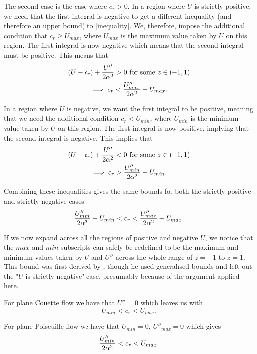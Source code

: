 The second case is the case where $ c_r > 0 $. In a region where $ U $ is strictly positive, we need that the first integral is negative to get a different inequality (and therefore an upper bound) to \eqref{inequality}. We, therefore, impose the additional condition that $ c_r \geq U_{max} $, where $ U_{max} $ is the maximum value taken by $U $ on this region. The first integral is now negative which means that the second integral must be positive. This means that
\begin{gather}
    (U - c_r) + \frac{U''}{2 \alpha^2} > 0 \text{ for some } z \in (-1, 1) \nonumber\\
    \implies c_r < \frac{U''_{max}}{2 \alpha^2} + U_{max}. 
\end{gather}

In a region where $ U $ is negative, we want the first integral to be positive, meaning that we need the additional condition $ c_r < U_{min}$, where $U_{min} $ is the minimum value taken by $ U $ on this region. The first integral is now positive, implying that the second integral is negative. This implies that
\begin{gather}
    (U - c_r) + \frac{U''}{2 \alpha^2} < 0 \text{ for some } z \in (-1, 1) \nonumber\\
    \implies c_r > \frac{U''_{min}}{2 \alpha^2} + U_{min}. 
\end{gather}

Combining these inequalities gives the same bounds for both the strictly positive and strictly negative cases 
\begin{equation}
    \frac{U''_{min}}{2 \alpha^2} + U_{min} < c_r < \frac{U''_{max}}{2 \alpha^2} + U_{max}.
    \label{paicr}
\end{equation}

If we now expand across all the regions of positive and negative $ U $, we notice that the $ max$ and $ min$ subscripts can safely be redefined to be the maximum and minimum values taken by $ U$ and $ U''$ across the whole range of $ z = -1 $ to $ z = 1$. This bound was first derived by \citet{pai1954generalization}, though he used generalised bounds and left out the "$ U $ is strictly negative" case, presumably because of the argument applied here.

For plane Couette flow we have that $ U'' = 0 $ which leaves us with
\begin{equation}
    U_{min} < c_r < U_{max}.
\end{equation}

For plane Poiseuille flow we have that $ U_{min} = 0 $, $ U''_{max} = 0 $ which gives
\begin{equation}
    \frac{U''_{min}}{2 \alpha^2} < c_r < U_{max}.
\end{equation}

